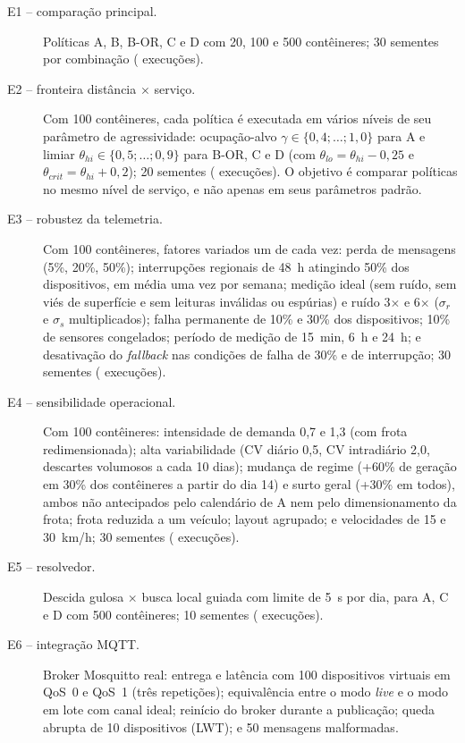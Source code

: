 \begin{description}
  \item[E1 -- comparação principal.] Políticas A, B, B-OR, C e D com 20, 100 e
  500 contêineres; 30 sementes por combinação (\NExecEUm{} execuções).
  \item[E2 -- fronteira distância $\times$ serviço.] Com 100 contêineres, cada
  política é executada em vários níveis de seu parâmetro de agressividade:
  ocupação-alvo $\gamma \in \{0{,}4; \dots; 1{,}0\}$ para A e limiar
  $\theta_{hi} \in \{0{,}5; \dots; 0{,}9\}$ para B-OR, C e D (com $\theta_{lo}
  = \theta_{hi} - 0{,}25$ e $\theta_{crit} = \theta_{hi} + 0{,}2$);
  20 sementes (\NExecEDois{} execuções). O objetivo é comparar políticas no
  mesmo nível de serviço, e não apenas em seus parâmetros padrão.
  \item[E3 -- robustez da telemetria.] Com 100 contêineres, fatores variados um
  de cada vez: perda de mensagens (5\%, 20\%, 50\%); interrupções regionais de
  48~h atingindo 50\% dos dispositivos, em média uma vez por semana; medição
  ideal (sem ruído, sem viés de superfície e sem leituras inválidas ou
  espúrias) e ruído 3$\times$ e 6$\times$ ($\sigma_r$ e $\sigma_s$ multiplicados); falha permanente de 10\% e 30\% dos dispositivos;
  10\% de sensores congelados; período de medição de 15~min, 6~h e 24~h; e
  desativação do \emph{fallback} nas condições de falha de 30\% e de
  interrupção; 30 sementes (\NExecETres{} execuções).
  \item[E4 -- sensibilidade operacional.] Com 100 contêineres: intensidade de
  demanda 0,7 e 1,3 (com frota redimensionada); alta variabilidade (CV diário
  0,5, CV intradiário 2,0, descartes volumosos a cada 10 dias); mudança de
  regime (+60\% de geração em 30\% dos contêineres a partir do dia 14) e surto
  geral (+30\% em todos), ambos não antecipados pelo calendário de A nem pelo
  dimensionamento da frota; frota reduzida a um veículo; layout
  agrupado; e velocidades de 15 e 30~km/h; 30 sementes (\NExecEQuatro{} execuções).
  \item[E5 -- resolvedor.] Descida gulosa $\times$ busca local guiada com
  limite de 5~s por dia, para A, C e D com 500 contêineres; 10 sementes
  (\NExecECinco{} execuções).
  \item[E6 -- integração MQTT.] Broker Mosquitto real: entrega e latência com
  100 dispositivos virtuais em QoS~0 e QoS~1 (três repetições); equivalência
  entre o modo \emph{live} e o modo em lote com canal ideal; reinício do broker
  durante a publicação; queda abrupta de 10 dispositivos (LWT); e 50 mensagens
  malformadas.
\end{description}

